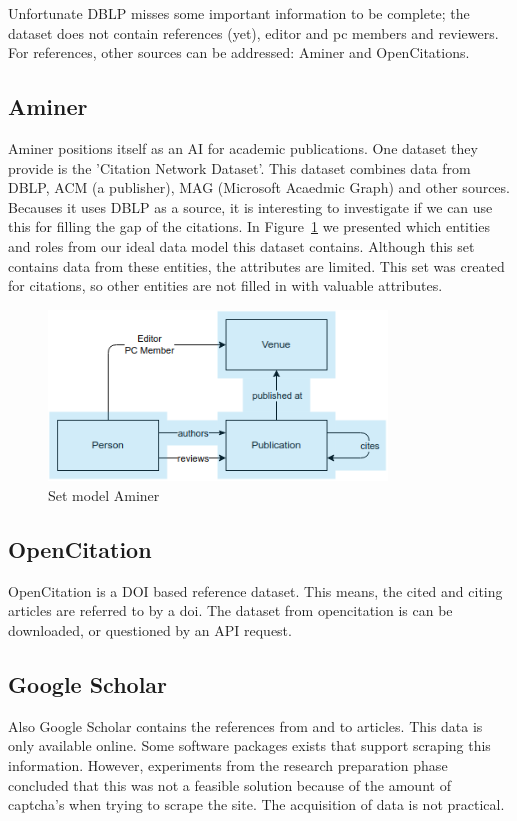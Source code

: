 \documentclass{ou-report}
\begin{document}
Unfortunate DBLP misses some important information to be complete; the dataset
does not contain references (yet), editor and pc members and reviewers. For 
references, other sources can be addressed: Aminer and OpenCitations.

\subsection{Aminer}
Aminer positions itself as an AI for academic publications. One dataset they 
provide is the 
'Citation Network Dataset'. This dataset combines data from DBLP, ACM (a 
publisher), MAG (Microsoft Acaedmic Graph)
and other sources. Becauses it uses DBLP as a source, it is interesting to 
investigate if we can use this for filling the gap of the citations.
In Figure~\ref{fig:set_model_aminer} we presented which entities and roles
from our ideal data model this dataset contains. Although this set contains data
from these entities, the attributes are limited. This set was created for
citations, so other entities are not filled in with valuable attributes.
\begin{figure}[H]
\includegraphics[width=9cm]{images/set_model_aminer.png}
\centering
\caption{Set model Aminer}
\label{fig:set_model_aminer}
\end{figure}


\subsection{OpenCitation} 
OpenCitation is a DOI based reference dataset. This means, the cited and citing 
articles are referred to by a doi. 
The dataset from opencitation is can be downloaded, or questioned by an API request. 


\subsection{Google Scholar}
\label{subsec:google_scholar}
Also Google Scholar contains the references from and to articles. This data is 
only available online. Some software packages exists that support scraping this
information. However, experiments from the research preparation phase concluded
that this was not a feasible solution because of the amount of captcha's when
trying to scrape the site. The acquisition of data is not practical.
\end{document}
